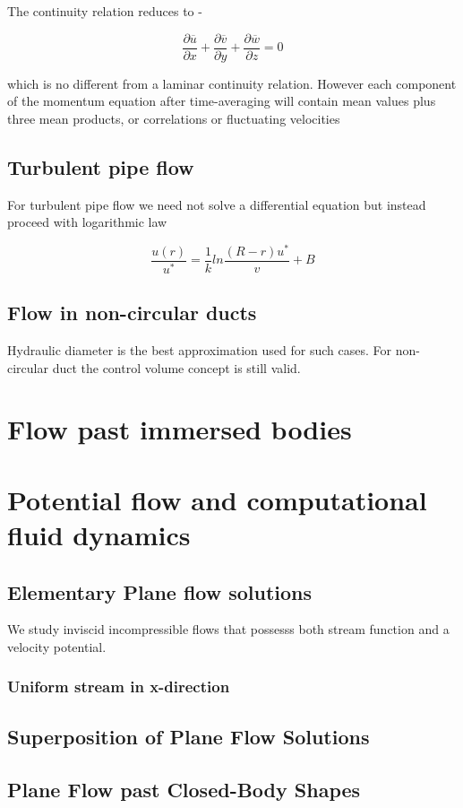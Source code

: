 \documentclass{report}
\begin{document}
The continuity relation reduces to - 

\[ \frac{\partial \overline{u}}{\partial x} + \frac{\partial \overline{v}}{\partial y} + \frac{\partial \overline{w}}{\partial z} = 0 \] 

which is no different from a laminar continuity relation.
However each component of the momentum equation after time-averaging will contain mean values plus three mean products, or correlations or
fluctuating velocities 
\section{Turbulent pipe flow}
For turbulent pipe flow we need not solve a differential equation but instead proceed with logarithmic law 

\[ \frac{u(r)}{u^*} = \frac{1}{k} ln \frac{(R-r)u^*}{v} + B\]
\section{Flow in non-circular ducts}
Hydraulic diameter is the best approximation used for such cases. For non-circular duct the control volume concept is still valid.
\chapter{Flow past immersed bodies}

\chapter{Potential flow and computational fluid dynamics}
\section{Elementary Plane flow solutions}
We study inviscid incompressible flows that possesss both stream function and a velocity potential.
\subsection{Uniform stream in x-direction}

\section{Superposition of Plane Flow Solutions}
\section{Plane Flow past Closed-Body Shapes}
\end{document}
